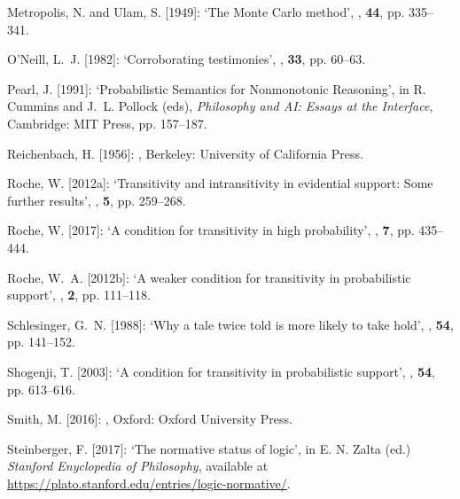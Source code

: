 \documentclass[a4paper,11pt]{article}
\begin{document}
\begin{thebibliography}{}
Metropolis, N. and Ulam, S. [1949]:
\newblock `The {M}onte {C}arlo method',
,
  \textbf{44}, pp. 335--341.

O'Neill, L.~J. [1982]:
\newblock `Corroborating testimonies',
,
  \textbf{33}, pp. 60--63.

Pearl, J. [1991]:
\newblock `Probabilistic Semantics for Nonmonotonic Reasoning',
\newblock in R. Cummins and J.~L. Pollock (eds), {\em {Philosophy and AI:
  Essays at the Interface}}, Cambridge: MIT Press, pp. 157--187.

Reichenbach, H. [1956]:
,
\newblock Berkeley: University of California Press.

Roche, W. [2012a]:
\newblock `Transitivity and intransitivity in evidential support: {S}ome further
  results',
, \textbf{5}, pp. 259--268.

Roche, W. [2017]:
\newblock `A condition for transitivity in high probability',
, \textbf{7}, pp. 435--444.

Roche, W.~A. [2012b]:
\newblock `A weaker condition for transitivity in probabilistic support',
, \textbf{2}, pp. 111--118.

Schlesinger, G.~N. [1988]:
\newblock `Why a tale twice told is more likely to take hold',
, \textbf{54}, pp. 141--152.

Shogenji, T. [2003]:
\newblock `A condition for transitivity in probabilistic support',
, \textbf{54}, pp. 613--616.

Smith, M. [2016]:
,
\newblock Oxford: Oxford University Press.

Steinberger, F. [2017]:
\newblock `The normative status of logic',
\newblock in E. N. Zalta (ed.) {\em Stanford Enyclopedia of Philosophy},
\newblock available at  \href{https://plato.stanford.edu/entries/logic-normative/}{https://plato.stanford.edu/entries/logic-normative/}.


\end{thebibliography}
\end{document}
